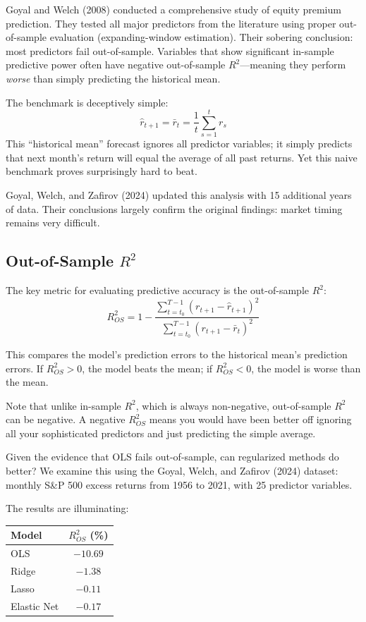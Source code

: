 \documentclass[11pt,a4paper]{article}
\begin{document}
Goyal and Welch (2008) conducted a comprehensive study of equity premium prediction. They tested all major predictors from the literature using proper out-of-sample evaluation (expanding-window estimation). Their sobering conclusion: most predictors fail out-of-sample. Variables that show significant in-sample predictive power often have negative out-of-sample $R^2$---meaning they perform \emph{worse} than simply predicting the historical mean.

The benchmark is deceptively simple:
\[
\widehat{r}_{t+1} = \bar{r}_t = \frac{1}{t} \sum_{s=1}^{t} r_s
\]
This ``historical mean'' forecast ignores all predictor variables; it simply predicts that next month's return will equal the average of all past returns. Yet this naive benchmark proves surprisingly hard to beat.

Goyal, Welch, and Zafirov (2024) updated this analysis with 15 additional years of data. Their conclusions largely confirm the original findings: market timing remains very difficult.

\subsection{Out-of-Sample $R^2$}

The key metric for evaluating predictive accuracy is the out-of-sample $R^2$:
\[
R^2_{OS} = 1 - \frac{\sum_{t=t_0}^{T-1}(r_{t+1} - \widehat{r}_{t+1})^2}{\sum_{t=t_0}^{T-1}(r_{t+1} - \bar{r}_{t})^2}
\]

This compares the model's prediction errors to the historical mean's prediction errors. If $R^2_{OS} > 0$, the model beats the mean; if $R^2_{OS} < 0$, the model is worse than the mean.

Note that unlike in-sample $R^2$, which is always non-negative, out-of-sample $R^2$ can be negative. A negative $R^2_{OS}$ means you would have been better off ignoring all your sophisticated predictors and just predicting the simple average.

Given the evidence that OLS fails out-of-sample, can regularized methods do better? We examine this using the Goyal, Welch, and Zafirov (2024) dataset: monthly S\&P 500 excess returns from 1956 to 2021, with 25 predictor variables.

The results are illuminating:

\begin{center}
\begin{tabular}{lc}
\toprule
\textbf{Model} & \textbf{$R^2_{OS}$ (\%)} \\
\midrule
OLS & $-10.69$ \\
Ridge & $-1.38$ \\
Lasso & $-0.11$ \\
Elastic Net & $-0.17$ \\
\bottomrule
\end{tabular}
\end{center}
\end{document}
